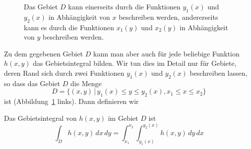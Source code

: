 \begin{figure}
\centering
{}
\caption{Das Gebiet $D$ kann einerseits durch die Funktionen
$y_1(x)$ und $y_2(x)$ in Abhängigkeit von $x$ beschreiben werden,
andererseits kann es durch die Funktionen
$x_1(y)$ und $x_2(y)$ in Abhängigkeit von $y$ beschreiben werden.
\label{skript:kruemmung:gebiet}}
\end{figure}
Zu dem gegebenen Gebiet $D$ kann man aber auch für jede beliebige
Funktion $h(x,y)$ das Gebietsintegral bilden.
Wir tun dies im Detail nur für Gebiete, deren Rand sich durch zwei
Funktionen $y_1(x)$ und $y_2(x)$ beschreiben lassen, so dass das
Gebiet $D$ die Menge
\[
D=\{ (x,y) \,|\, y_1(x) \le y \le y_2(x), x_1\le x\le x_2\}
\]
ist (Abbildung~\ref{skript:kruemmung:gebiet} links).
Dann definieren wir

\begin{definition}
Das Gebietsintegral von $h(x,y)$ im Gebiet $D$ ist
\[
\int_D h(x,y)\,dx\,dy = \int_{x_1}^{x_2} \int_{y_1(x)}^{y_2(x)} h(x,y)\,dy\,dx
\]
\end{definition}

